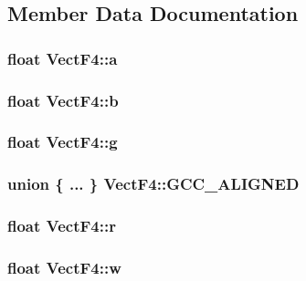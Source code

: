 \subsection{Member Data Documentation}
\hypertarget{classVectF4_a542bc439b69669c1fe0599626e2f54ad}{
\subsubsection[{a}]{\setlength{\rightskip}{0pt plus 5cm}float Vect\-F4\-::a}}\label{classVectF4_a542bc439b69669c1fe0599626e2f54ad}
\hypertarget{classVectF4_a13da3dbc083578f52865e368abd0c3dd}{
\subsubsection[{b}]{\setlength{\rightskip}{0pt plus 5cm}float Vect\-F4\-::b}}\label{classVectF4_a13da3dbc083578f52865e368abd0c3dd}
\hypertarget{classVectF4_ac988799edd7aa8a83196922ffad4cc5e}{
\subsubsection[{g}]{\setlength{\rightskip}{0pt plus 5cm}float Vect\-F4\-::g}}\label{classVectF4_ac988799edd7aa8a83196922ffad4cc5e}
\hypertarget{classVectF4_ad19036395e399964bae162f646997526}{
\subsubsection[{G\-C\-C\-\_\-\-A\-L\-I\-G\-N\-E\-D}]{\setlength{\rightskip}{0pt plus 5cm}union \{ ... \}   Vect\-F4\-::\-G\-C\-C\-\_\-\-A\-L\-I\-G\-N\-E\-D}}\label{classVectF4_ad19036395e399964bae162f646997526}
\hypertarget{classVectF4_af832cf6038bfe6de1ca52cefed6f8184}{
\subsubsection[{r}]{\setlength{\rightskip}{0pt plus 5cm}float Vect\-F4\-::r}}\label{classVectF4_af832cf6038bfe6de1ca52cefed6f8184}
\hypertarget{classVectF4_a9e59fa7a69f80b5af58c3bf358ba7b4a}{
\subsubsection[{w}]{\setlength{\rightskip}{0pt plus 5cm}float Vect\-F4\-::w}}\label{classVectF4_a9e59fa7a69f80b5af58c3bf358ba7b4a}
